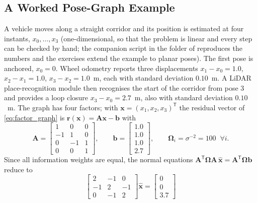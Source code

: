 \subsection{A Worked Pose-Graph Example}
\label{subsec:pose-graph-example}
\begin{example}
\label{ex:pose-graph-1d}
A vehicle moves along a straight corridor and its position is estimated at four instants, $x_0,\ldots,x_3$ (one-dimensional, so that the problem is linear and every step can be checked by hand; the companion script in the folder  of  reproduces the numbers and the exercises extend the example to planar poses). The first pose is anchored, $x_0=0$. Wheel odometry reports three displacements $x_1-x_0=1.0$, $x_2-x_1=1.0$, $x_3-x_2=1.0$~m, each with standard deviation $0.10$~m. A LiDAR place-recognition module then recognises the start of the corridor from pose 3 and provides a loop closure $x_3-x_0=2.7$~m, also with standard deviation $0.10$~m. The graph has four factors; with $\mathbf{x}=(x_1,x_2,x_3)^{\mathsf T}$ the residual vector of \eqref{eq:factor_graph} is $\mathbf{r}(\mathbf{x})=\mathbf{A}\mathbf{x}-\mathbf{b}$ with
\begin{equation*}
\mathbf{A}=\begin{bmatrix}1&0&0\\-1&1&0\\0&-1&1\\0&0&1\end{bmatrix},\qquad
\mathbf{b}=\begin{bmatrix}1.0\\1.0\\1.0\\2.7\end{bmatrix},\qquad
\mathbf{\Omega}_i=\sigma^{-2}=100\;\;\forall i .
\end{equation*}
Since all information weights are equal, the normal equations $\mathbf{A}^{\mathsf T}\mathbf{\Omega}\mathbf{A}\,\widehat{\mathbf{x}}=\mathbf{A}^{\mathsf T}\mathbf{\Omega}\mathbf{b}$ reduce to
\begin{equation*}
\begin{bmatrix}2&-1&0\\-1&2&-1\\0&-1&2\end{bmatrix}\widehat{\mathbf{x}}
=\begin{bmatrix}0\\0\\3.7\end{bmatrix}

\end{equation*}
\end{example}
